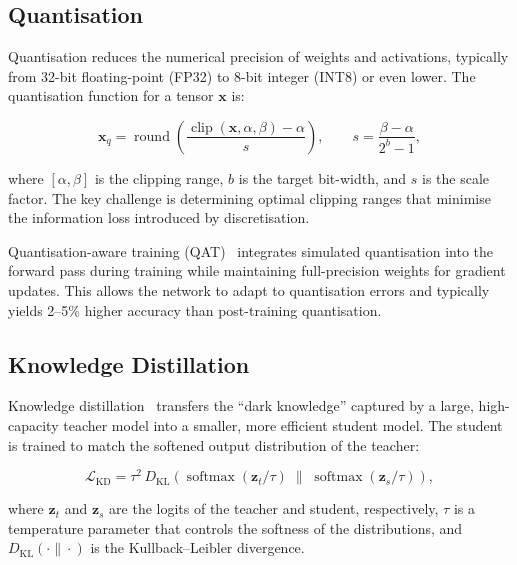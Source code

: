 \documentclass[12pt,a4paper,oneside]{book}
\begin{document}
\subsection{Quantisation}

Quantisation reduces the numerical precision of weights and
activations, typically from 32-bit floating-point (FP32) to 8-bit
integer (INT8) or even lower. The quantisation function for a tensor
$\mathbf{x}$ is:

\begin{equation}
\mathbf{x}_q = \operatorname{round}\!\left(
\frac{\operatorname{clip}(\mathbf{x}, \alpha, \beta) - \alpha}{s}
\right),
\qquad s = \frac{\beta - \alpha}{2^b - 1},
\label{eq:quant}
\end{equation}

where $[\alpha, \beta]$ is the clipping range, $b$ is the target
bit-width, and $s$ is the scale factor. The key challenge is determining
optimal clipping ranges that minimise the information loss introduced by
discretisation.

Quantisation-aware training (QAT)~\cite{kingma2014adam} integrates
simulated quantisation into the forward pass during training while
maintaining full-precision weights for gradient updates. This allows the
network to adapt to quantisation errors and typically yields 2--5\%
higher accuracy than post-training quantisation.

\subsection{Knowledge Distillation}

Knowledge distillation~\cite{goodfellow2016} transfers the
``dark knowledge'' captured by a large, high-capacity teacher model into
a smaller, more efficient student model. The student is trained to
match the softened output distribution of the teacher:

\begin{equation}
\mathcal{L}_{\text{KD}} =
\tau^2 \, D_{\text{KL}}\!\left(
\operatorname{softmax}(\mathbf{z}_t / \tau) \;\big\|\;
\operatorname{softmax}(\mathbf{z}_s / \tau)
\right),
\label{eq:distill}
\end{equation}

where $\mathbf{z}_t$ and $\mathbf{z}_s$ are the logits of the teacher
and student, respectively, $\tau$ is a temperature parameter that
controls the softness of the distributions, and
$D_{\text{KL}}(\cdot\|\cdot)$ is the Kullback--Leibler divergence.
\end{document}
